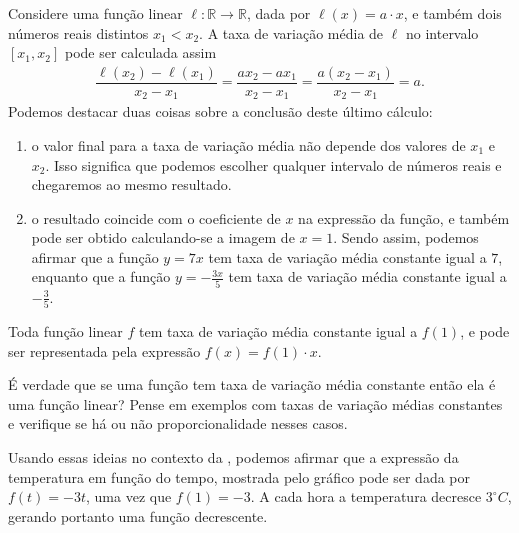 Considere uma função linear \(\ell:\mathbb{R}\to\mathbb{R}\), dada por \(\ell(x)=a\cdot x\), e também dois números reais distintos \(x_1<x_2\). A taxa de variação média de \(\ell\) no intervalo  \([x_1,x_2]\) pode ser calculada assim
\begin{equation*}
\begin{split}\dfrac{\ell(x_2)-\ell(x_1)}{x_2-x_1}=\dfrac{a x_2- a x_1}{x_2-x_1}=\dfrac{a(x_2-x_1)}{x_2-x_1}=a.\end{split}
\end{equation*}
Podemos destacar duas coisas sobre a conclusão deste último cálculo:
\begin{enumerate}
\item {} 
o valor final para a taxa de variação média não depende dos valores de \(x_1\) e \(x_2\). Isso significa que podemos escolher qualquer intervalo  de números reais e chegaremos ao mesmo resultado.

\item {} 
o resultado coincide com o coeficiente de \(x\) na expressão da função, e também pode ser obtido calculando-se a imagem de \(x=1\). Sendo assim, podemos afirmar que a função \(y=7x\) tem taxa de variação média constante igual a \(7\), enquanto que a função \(y=-\frac {3x}5\) tem taxa de variação média constante igual a \(-\frac {3}5\).

\end{enumerate}

\begin{observation}{}
Toda função linear $f$ tem taxa de variação média constante igual a $f(1)$, e pode ser representada pela expressão $f(x)=f(1)\cdot x$.
\end{observation}

\begin{reflection}

É verdade que se uma função tem taxa de variação média constante então ela é uma função linear? Pense em exemplos com taxas de variação médias constantes e verifique se há ou não proporcionalidade nesses casos.
\end{reflection}

Usando essas ideias no contexto da , podemos afirmar que a expressão da temperatura em função do tempo, mostrada pelo gráfico pode ser dada por \(f(t)=-3t\), uma vez que \(f(1)=-3\). A cada hora a temperatura decresce \(3^\circ C\), gerando portanto uma função decrescente.

